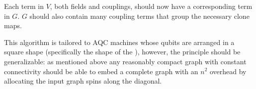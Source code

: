 Each term in $V$, both fields and couplings, should now have a corresponding term in $G$.  $G$ should also contain many coupling terms that group the necessary clone maps.  

This algorithm is tailored to AQC machines whose qubits are arranged in a square shape (specifically the shape of the \machine), however, the principle should be generalizable: as mentioned above any reasonably compact graph with constant connectivity should be able to embed a complete graph with an $n^2$ overhead by allocating the input graph spins along the diagonal.
